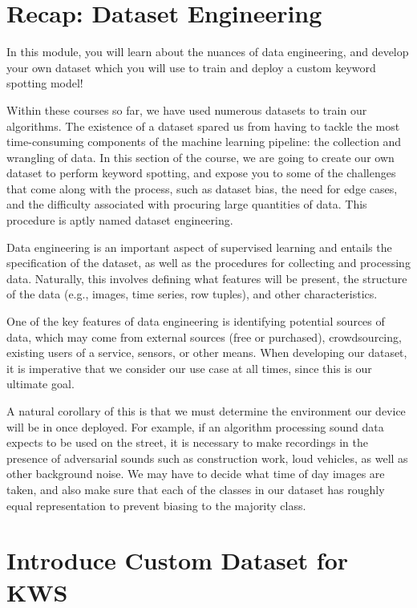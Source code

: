         

\section{Recap: Dataset Engineering}

    In this module, you will learn about the nuances of data engineering, and develop your own dataset which you will use to train and deploy a custom keyword spotting model!
    
    Within these courses so far, we have used numerous datasets to train our algorithms. The existence of a dataset spared us from having to tackle the most time-consuming components of the machine learning pipeline: the collection and wrangling of data. In this section of the course, we are going to create our own dataset to perform keyword spotting, and expose you to some of the challenges that come along with the process, such as dataset bias, the need for edge cases, and the difficulty associated with procuring large quantities of data. This procedure is aptly named dataset engineering.
    
    Data engineering is an important aspect of supervised learning and entails the specification of the dataset, as well as the procedures for collecting and processing data. Naturally, this involves defining what features will be present, the structure of the data (e.g., images, time series, row tuples), and other characteristics.
    
    One of the key features of data engineering is identifying potential sources of data, which may come from external sources (free or purchased), crowdsourcing, existing users of a service, sensors, or other means. When developing our dataset, it is imperative that we consider our use case at all times, since this is our ultimate goal.
    
    A natural corollary of this is that we must determine the environment our device will be in once deployed. For example, if an algorithm processing sound data expects to be used on the street, it is necessary to make recordings in the presence of adversarial sounds such as construction work, loud vehicles, as well as other background noise. We may have to decide what time of day images are taken, and also make sure that each of the classes in our dataset has roughly equal representation to prevent biasing to the majority class. 
    
\section{Introduce Custom Dataset for KWS}

